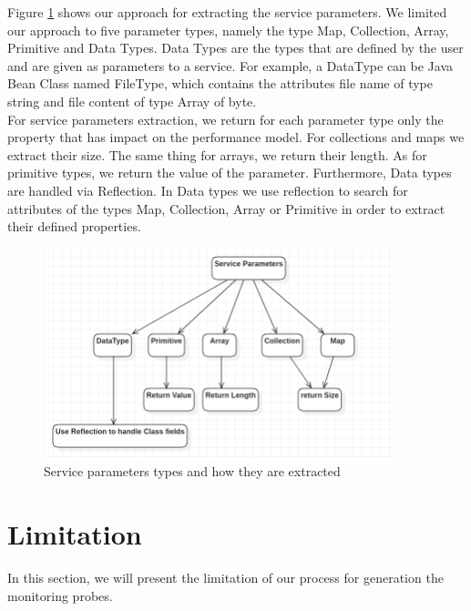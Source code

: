 Figure \ref{fig:service_parameters} shows our approach for extracting the service parameters. We limited our approach to five parameter types, namely the type Map, Collection, Array, Primitive and Data Types. Data Types are the types that are defined by the user and are given as parameters to a service. For example, a DataType can be Java Bean Class named FileType, which contains the attributes file name of type string and file content of type Array of byte.\\

For service parameters extraction, we return for each parameter type only the property that has impact on the performance model. For collections and maps we extract their size. The same thing for arrays, we return their length. As for primitive types, we return the value of the parameter. Furthermore, Data types are handled via Reflection. In Data types we use reflection to search for attributes of the types Map, Collection, Array or Primitive in order to extract their defined properties. \\


\begin{figure}[h]
\centering
\includegraphics[width=0.9\textwidth]{figures/service_parameters}
\caption{Service parameters types and how they are extracted}
\label{fig:service_parameters}
\end{figure}


\section{Limitation}
\label{sec:Limitation}
In this section, we will present the limitation of our process for generation the monitoring probes.\\ 

